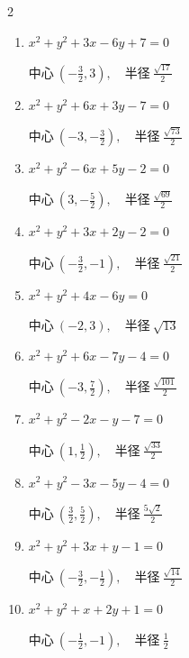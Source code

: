 \begin{multicols}{2}
\begin{enumerate}
        $\displaystyle 中心\: \left(-\frac{5}{2},\frac{7}{2}\right), \quad 半径 \ \frac{\sqrt{46}}{2}$

  \item $x^{2}+y^{2}+3x-6y+7=0$

        $\displaystyle 中心\: \left(-\frac{3}{2},3\right), \quad 半径 \ \frac{\sqrt{17}}{2}$

  \item $x^{2}+y^{2}+6x+3y-7=0$

        $\displaystyle 中心\: \left(-3,-\frac{3}{2}\right), \quad 半径 \ \frac{\sqrt{73}}{2}$

\columnbreak %

  \item $x^{2}+y^{2}-6x+5y-2=0$

        $\displaystyle 中心\: \left(3,-\frac{5}{2}\right), \quad 半径 \ \frac{\sqrt{69}}{2}$

  \item $x^{2}+y^{2}+3x+2y-2=0$

        $\displaystyle 中心\: \left(-\frac{3}{2},-1\right), \quad 半径 \ \frac{\sqrt{21}}{2}$

  \item $x^{2}+y^{2}+4x-6y=0$

        $\displaystyle 中心\: \left(-2,3\right), \quad 半径 \ \sqrt{13}$

  \item $x^{2}+y^{2}+6x-7y-4=0$

        $\displaystyle 中心\: \left(-3,\frac{7}{2}\right), \quad 半径 \ \frac{\sqrt{101}}{2}$

  \item $x^{2}+y^{2}-2x-y-7=0$

        $\displaystyle 中心\: \left(1,\frac{1}{2}\right), \quad 半径 \ \frac{\sqrt{33}}{2}$

  \item $x^{2}+y^{2}-3x-5y-4=0$

        $\displaystyle 中心\: \left(\frac{3}{2},\frac{5}{2}\right), \quad 半径 \ \frac{5\sqrt{2}}{2}$

  \item $x^{2}+y^{2}+3x+y-1=0$

        $\displaystyle 中心\: \left(-\frac{3}{2},-\frac{1}{2}\right), \quad 半径 \ \frac{\sqrt{14}}{2}$

  \item $x^{2}+y^{2}+x+2y+1=0$

        $\displaystyle 中心\: \left(-\frac{1}{2},-1\right), \quad 半径 \ \frac{1}{2}$


\end{enumerate}
\end{multicols}
